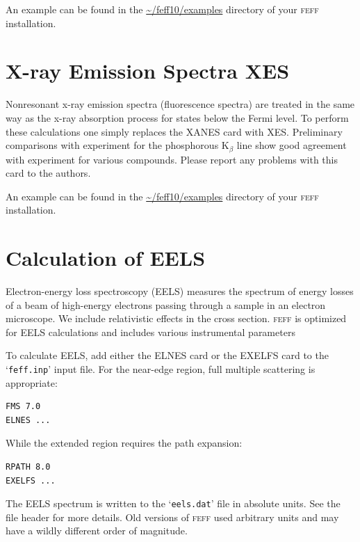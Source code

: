 \documentclass[11pt,oneside]{report} %
\renewcommand{\htmlref}[2]{\hyperlink{#2}{#1}}
\newcommand{\program}[1]{\textsc{#1}}
\newcommand{\feff}{\program{feff}}
\newcommand{\file}[1]{`\texttt{#1}'}
\renewcommand{\htmlref}[2]{{#1}} %
\begin{document}
An example can be found in the \textcolor{green}{\url{\~/feff10/examples}} directory of your {\feff} installation.



\section{X-ray Emission Spectra XES}
\label{sec:XES}
Nonresonant x-ray emission spectra (fluorescence spectra) 
are treated in the same way as the x-ray absorption process
for states below the Fermi level. To perform these calculations one simply
replaces the \htmlref{XANES}{card:xan} card with \htmlref{XES}{card:xes}. 
Preliminary comparisons with experiment
for the phosphorous K$_{\beta}$ line show good agreement with experiment for various
compounds. Please report any problems with this card to the authors.

An example can be found in the \textcolor{green}{\url{\~/feff10/examples}} directory of your {\feff} installation.



\section{Calculation of EELS}
\label{sec:EELS}
Electron-energy loss spectroscopy (EELS) measures the spectrum of 
energy losses of a beam of high-energy electrons passing through a 
sample in an electron microscope. We include relativistic effects in the cross 
section.  {\feff} is optimized for EELS calculations and includes various instrumental parameters

To calculate EELS, add either the \htmlref{ELNES}{card:eln} card or the \htmlref{EXELFS}{card:exe} card to the \file{feff.inp} input file.  For the near-edge region, full multiple scattering is appropriate:
\begin{verbatim}
FMS 7.0
ELNES ...
\end{verbatim}
While the extended region requires the path expansion:
\begin{verbatim}
RPATH 8.0
EXELFS ...
\end{verbatim}

The EELS spectrum is written to the \file{eels.dat} file in absolute units.  See the file header for more details.  Old versions of {\feff} used arbitrary units and may have a wildly different order of magnitude.
\end{document}
